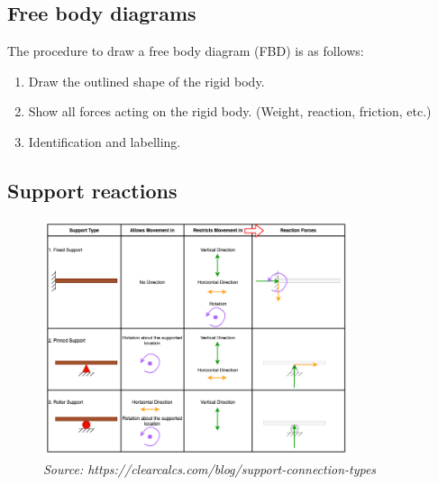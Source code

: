\documentclass{article}
\begin{document}
\subsection{Free body diagrams}
The procedure to draw a free body diagram (FBD) is as follows:
\begin{enumerate}
    \item Draw the outlined shape of the rigid body.
    \item Show all forces acting on the rigid body. (Weight, reaction, friction, etc.)
    \item Identification and labelling.
\end{enumerate}

\subsection{Support reactions}
\begin{figure}[H]
    \centering
    \includegraphics[width=0.8\textwidth]{./img/support.png}
    \caption*{\tiny\textit{\color{gray}Source: https://clearcalcs.com/blog/support-connection-types}}
\end{figure}
\end{document}
